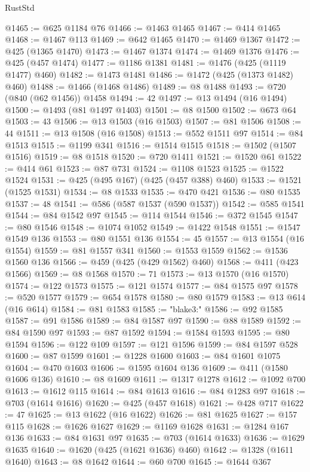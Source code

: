 \begin{lexlean}{RustStd}
\begin{coremodule}
{\begin{coremodule}
{{{{{{{{{{{{{{{{{{{{{{{{{{{{{{{{{{{{{{{{{{{{{{{{{{{{{{@1465 := @625 @1184 @76
@1466 := @1463 @1465
@1467 := @414 @1465
@1468 := @1467 @113
@1469 := @642 @1465
@1470 := @1469 @1367
@1472 := @425 (@1365 @1470)
@1473 := @1467 @1374
@1474 := @1469 @1376
@1476 := @425 (@457 @1474)
@1477 := @1186 @1381
@1481 := @1476 (@425 (@1119 @1477) @460)
@1482 := @1473 @1481
@1486 := @1472 (@425 (@1373 @1482) @460)
@1488 := @1466 (@1468 @1486)
@1489 := @8 @1488
@1493 := @720 (@840 (@62 @1456)) @1458
@1494 := 42
@1497 := @13 @1494 (@16 @1494)
@1500 := @1493 (@81 @1497 @1403)
@1501 := @8 @1500
@1502 := @673 @64
@1503 := 43
@1506 := @13 @1503 (@16 @1503)
@1507 := @81 @1506
@1508 := 44
@1511 := @13 @1508 (@16 @1508)
@1513 := @552 @1511 @97
@1514 := @84 @1513
@1515 := @1199 @341
@1516 := @1514 @1515
@1518 := @1502 (@1507 @1516)
@1519 := @8 @1518
@1520 := @720 @1411
@1521 := @1520 @61
@1522 := @414 @61
@1523 := @87 @731
@1524 := @1108 @1523
@1525 := @1522 @1524
@1531 := @425 (@495 @167) (@425 (@457 @388) @460)
@1533 := @1521 (@1525 @1531)
@1534 := @8 @1533
@1535 := @470 @421
@1536 := @80 @1535
@1537 := 48
@1541 := @586 (@587 @1537 (@590 @1537))
@1542 := @585 @1541
@1544 := @84 @1542 @97
@1545 := @114 @1544
@1546 := @372 @1545
@1547 := @80 @1546
@1548 := @1074 @1052
@1549 := @1422 @1548
@1551 := @1547 @1549 @136
@1553 := @80 @1551 @136
@1554 := 45
@1557 := @13 @1554 (@16 @1554)
@1559 := @81 @1557 @341
@1560 := @1553 @1559
@1562 := @1536 @1560 @136
@1566 := @459 (@425 (@429 @1562) @460)
@1568 := @411 (@423 @1566)
@1569 := @8 @1568
@1570 := 71
@1573 := @13 @1570 (@16 @1570)
@1574 := @122 @1573
@1575 := @121 @1574
@1577 := @84 @1575 @97
@1578 := @520 @1577
@1579 := @654 @1578
@1580 := @80 @1579
@1583 := @13 @614 (@16 @614)
@1584 := @81 @1583
@1585 := "blake3:"
@1586 := @92 @1585
@1587 := @91 @1586
@1589 := @84 @1587 @97
@1590 := @88 @1589
@1592 := @84 @1590 @97
@1593 := @87 @1592
@1594 := @1584 @1593
@1595 := @80 @1594
@1596 := @122 @109
@1597 := @121 @1596
@1599 := @84 @1597 @528
@1600 := @87 @1599
@1601 := @1228 @1600
@1603 := @84 @1601 @1075
@1604 := @470 @1603
@1606 := @1595 @1604 @136
@1609 := @411 (@1580 @1606 @136)
@1610 := @8 @1609
@1611 := @1317 @1278
@1612 := @1092 @700
@1613 := @1612 @115
@1614 := @84 @1613
@1616 := @84 @1283 @97
@1618 := @703 (@1614 @1616)
@1620 := @425 (@457 @1618)
@1621 := @428 @717
@1622 := 47
@1625 := @13 @1622 (@16 @1622)
@1626 := @81 @1625
@1627 := @157 @115
@1628 := @1626 @1627
@1629 := @1169 @1628
@1631 := @1284 @167 @136
@1633 := @84 @1631 @97
@1635 := @703 (@1614 @1633)
@1636 := @1629 @1635
@1640 := @1620 (@425 (@1621 @1636) @460)
@1642 := @1328 (@1611 @1640)
@1643 := @8 @1642
@1644 := @60 @700
@1645 := @1644 @367
}}}}}}}}}}}}}}}}}}}}}}}}}}}}}}}}}}}}}}}}}}}}}}}}}}}}}}
\end{coremodule}}
\end{coremodule}
\end{lexlean}
